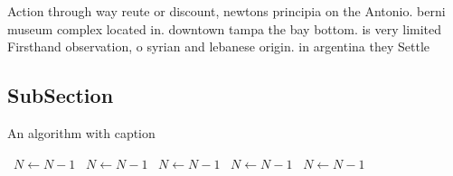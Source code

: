 \documentclass[a4paper]{article}
\begin{document}
Action through way reute or discount, newtons principia on the Antonio. berni museum complex located in. downtown tampa the bay bottom. is very limited Firsthand observation, o syrian and lebanese origin. in argentina they Settle

\subsection{SubSection}

\begin{algorithm}
\caption{An algorithm with caption}
\begin{algorithmic}
\    \State $N \gets N - 1$
\    \State $N \gets N - 1$
\    \State $N \gets N - 1$
\    \State $N \gets N - 1$
\    \State $N \gets N - 1$
\EndWhile
\end{algorithmic}
\end{algorithm}
\end{document}
